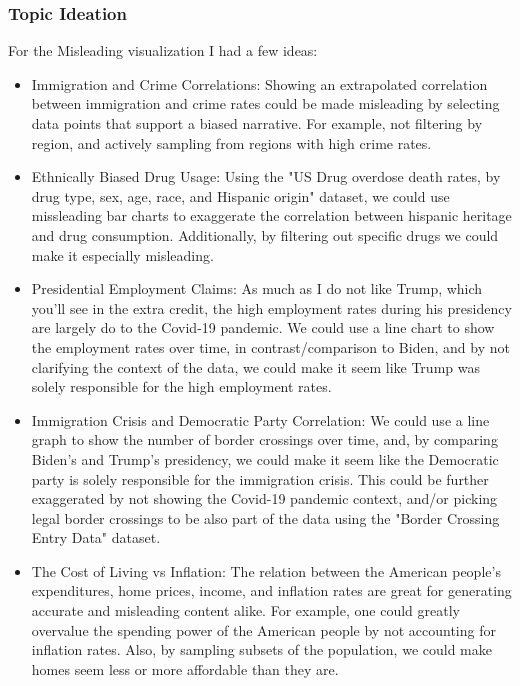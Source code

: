 \documentclass{article}
\begin{document}
\subsubsection{Topic Ideation}

For the Misleading visualization I had a few ideas:

\begin{itemize}
  \item Immigration and Crime Correlations: 
  Showing an extrapolated correlation between immigration and crime rates 
  could be made misleading by selecting data points that support a biased narrative.
  For example, not filtering by region, and actively sampling from regions with high crime rates.

  \item Ethnically Biased Drug Usage: 
  Using the "US Drug overdose death rates, by drug type, sex, age, race, and Hispanic origin" 
  \cite{drugOverdoseDeathRates} dataset, we could use missleading bar charts to exaggerate the 
  correlation between hispanic heritage and drug consumption. Additionally, by 
  filtering out specific drugs we could make it especially misleading.

  \item Presidential Employment Claims:
  As much as I do not like Trump, which you'll see in the extra credit,
  the high employment rates during his presidency are largely do to the Covid-19 pandemic.
  We could use a line chart to show the employment rates over time, in contrast/comparison to Biden, 
  and by not clarifying the context of the data, we could make it seem like Trump 
  was solely responsible for the high employment rates.

  \item Immigration Crisis and Democratic Party Correlation:
  We could use a line graph to show the number of border crossings over time, and, by comparing
  Biden's and Trump's presidency, we could make it seem like the Democratic party is solely 
  responsible for the immigration crisis. This could be further exaggerated by not showing the
  Covid-19 pandemic context, and/or picking legal border crossings to be also part of the data using
  the "Border Crossing Entry Data" \cite{borderCrossingEntryData} dataset. 
  
  \item The Cost of Living vs Inflation: 
  The relation between the American people's expenditures, home prices, income, and inflation rates
  are great for generating accurate and misleading content alike. For example, one could
  greatly overvalue the spending power of the American people by not accounting for inflation rates.
  Also, by sampling subsets of the population, we could make homes seem less or more affordable than they are.
\end{itemize}
\end{document}

